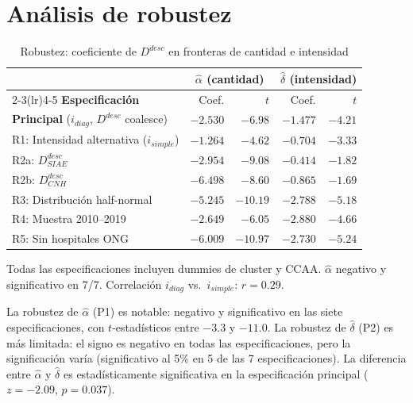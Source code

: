 \section{Análisis de robustez}

\begin{table}[htbp]
\centering
\caption{Robustez: coeficiente de $D^{desc}$ en fronteras de cantidad e intensidad}
\label{tab:robustez}
\begin{threeparttable}
\begin{tabular}{lrrrr}
\toprule
& \multicolumn{2}{c}{\textbf{$\hat{\alpha}$ (cantidad)}}
& \multicolumn{2}{c}{\textbf{$\hat{\delta}$ (intensidad)}} \\
\cmidrule(lr){2-3}\cmidrule(lr){4-5}
\textbf{Especificación} & Coef. & $t$ & Coef. & $t$ \\
\midrule
\textbf{Principal} ($i_{diag}$, $D^{desc}$ coalesce)
  & $-2.530$ & $-6.98$ & $-1.477$ & $-4.21$ \\[3pt]
R1: Intensidad alternativa ($i_{simple}$)
  & $-1.264$ & $-4.62$ & $-0.704$ & $-3.33$ \\
R2a: $D^{desc}_{SIAE}$
  & $-2.954$ & $-9.08$ & $-0.414$ & $-1.82$ \\
R2b: $D^{desc}_{CNH}$
  & $-6.498$ & $-8.60$ & $-0.865$ & $-1.69$ \\
R3: Distribución half-normal
  & $-5.245$ & $-10.19$ & $-2.788$ & $-5.18$ \\
R4: Muestra 2010--2019
  & $-2.649$ & $-6.05$ & $-2.880$ & $-4.66$ \\
R5: Sin hospitales ONG
  & $-6.009$ & $-10.97$ & $-2.730$ & $-5.24$ \\
\bottomrule
\end{tabular}
\begin{tablenotes}
  \small
  \item Todas las especificaciones incluyen dummies de cluster y CCAA. $\hat{\alpha}$ negativo y significativo en 7/7. Correlación $i_{diag}$ vs.\ $i_{simple}$: $r=0.29$.
\end{tablenotes}
\end{threeparttable}
\end{table}

La robustez de $\hat{\alpha}$ (P1) es notable: negativo y significativo en las siete especificaciones, con $t$-estadísticos entre $-3.3$ y $-11.0$. La robustez de $\hat{\delta}$ (P2) es más limitada: el signo es negativo en todas las especificaciones, pero la significación varía (significativo al 5\% en 5 de las 7 especificaciones). La diferencia entre $\hat{\alpha}$ y $\hat{\delta}$ es estadísticamente significativa en la especificación principal ($z=-2.09$, $p=0.037$).

